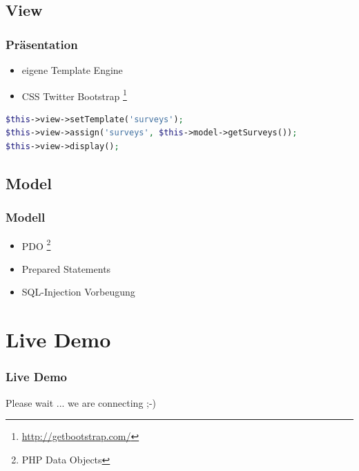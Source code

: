 \documentclass[xcolor=dvipsnames]{beamer}
\begin{document}
\subsection{View}
\begin{frame}[fragile] %
  \frametitle{Präsentation} %
  \begin{block}{}
	  \begin{itemize}
  		\item eigene Template Engine
  		\item CSS Twitter Bootstrap \footnote{\url{http://getbootstrap.com/}}
	  \end{itemize}
  \end{block}
  
\begin{lstlisting}[language=PHP]
$this->view->setTemplate('surveys');
$this->view->assign('surveys', $this->model->getSurveys());
$this->view->display();
\end{lstlisting} 

\end{frame}

\subsection{Model}
\begin{frame} %
  \frametitle{Modell} %
  \begin{block}{}
	  \begin{itemize}
  		\item PDO \footnote{PHP Data Objects}
  		\item Prepared Statements
  		\item SQL-Injection Vorbeugung
	  \end{itemize}
  \end{block} 
\end{frame}

\section{Live Demo}
\begin{frame} %
  \frametitle{Live Demo} %
  \begin{center}  
      \Huge	Please wait ... we are connecting ;-)
  \end{center}
\end{frame}
\end{document}
